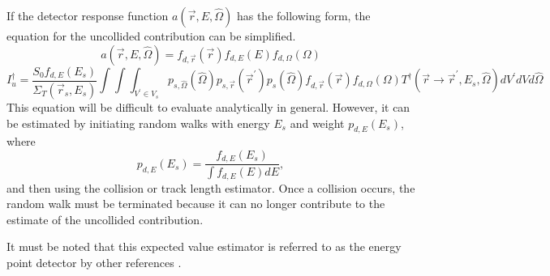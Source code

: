 If the detector response function $a(\vec{r},E,\hat{\Omega})$ has the following
form, the equation for the uncollided contribution can be simplified.
\begin{equation*}
  a(\vec{r},E,\hat{\Omega}) = f_{d,\vec{r}}(\vec{r})f_{d,E}(E)f_{d,\Omega}(\Omega)
\end{equation*}
\begin{equation*}
  I_u^{\dagger}  = \frac{S_0f_{d,E}(E_s)}{\Sigma_T(\vec{r}_s,E_s)}
  \int\int\int_{V^{'} \in V_s} p_{s,\hat{\Omega}}(\hat{\Omega}) p_{s,\vec{r}}(\vec{r}^{'})
  p_s(\hat{\Omega})f_{d,\vec{r}}(\vec{r})f_{d,\Omega}(\Omega)
  T^{\dagger}(\vec{r} \to \vec{r}^{'},E_s,\hat{\Omega})
  dV^{'}dVd\hat{\Omega}
\end{equation*}
This equation will be difficult to evaluate analytically in general. However, 
it can be estimated by initiating random walks with energy $E_s$ and weight
$p_{d,E}(E_s)$, where
\begin{equation*}
  p_{d,E}(E_s) = \frac{f_{d,E}(E_s)}{\int f_{d,E}(E) dE},
\end{equation*}
and then using the collision or track length estimator. Once a collision occurs,
the random walk must be terminated because it can no longer contribute to the 
estimate of the uncollided contribution.

It must be noted that this expected value estimator is referred to as the 
energy point detector by other references \citep{gabler_amos_2006}.
